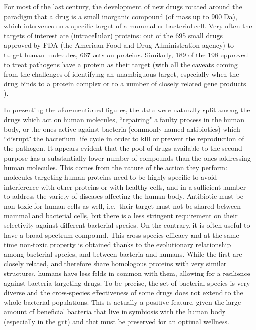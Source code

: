 For most of the last century, the development of new drugs rotated around the paradigm that a drug is a small inorganic compound (of mass up to 900 Da), which intervenes on a specific target of a mammal or bacterial cell. Very often the targets of interest are (intracellular) proteins: out of the 695 small drugs approved by FDA (the American Food and Drug Administration agency) to target human molecules, 667 acts on proteins. Similarly, 189 of the 198 approved to treat pathogens have a protein as their target
%
(with all the caveats coming from the challenges of identifying an unambiguous target, especially when the drug binds to a protein complex or to a number of closely related gene products \citep{Santos2017}).

In presenting the aforementioned figures, the data were naturally split among the drugs which act on human molecules, ``repairing" a faulty process in the human body, or the ones active against bacteria (commonly named antibiotics) which ``disrupt" the bacterium life cycle in order to kill or prevent the reproduction of the pathogen.
%
It appears evident that the pool of drugs available to the second purpose has a substantially lower number of compounds than the ones addressing human molecules. This comes from the nature of the action they perform: molecules targeting human proteins need to be highly specific to avoid interference with other proteins or with healthy cells, and in a sufficient number to address the variety of diseases affecting the human body.
%
Antibiotic must be non-toxic for human cells as well, i.e.\ their target must not be shared between mammal and bacterial cells, but there is a less stringent requirement on their selectivity against different bacterial species. On the contrary, it is often useful to have a broad-spectrum compound. This cross-species efficacy and at the same time non-toxic property is obtained thanks to the evolutionary relationship among bacterial species, and between bacteria and humans. While the first are closely related, and therefore share homologous proteins with very similar structures, humans have less folds in common with them, allowing for a resilience against bacteria-targeting drugs.
%
To be precise, the set of bacterial species is very diverse and the cross-species effectiveness of some drugs does not extend to the whole bacterial populations. This is actually a positive feature, given the large amount of beneficial bacteria that live in symbiosis with the human body (especially in the gut) and that must be preserved for an optimal wellness.

